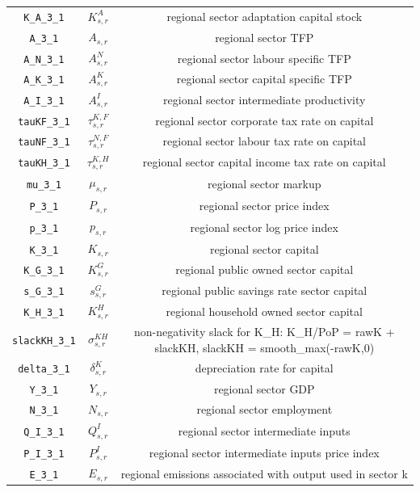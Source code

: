 \begin{center}
\begin{longtable}{ccc}
\texttt{K\_A\_3\_1} & ${K^{A}_{s,r}}$ & regional sector adaptation capital stock\\
\texttt{A\_3\_1} & ${A_{s,r}}$ & regional sector TFP\\
\texttt{A\_N\_3\_1} & ${A^{N}_{s,r}}$ & regional sector labour specific TFP\\
\texttt{A\_K\_3\_1} & ${A^{K}_{s,r}}$ & regional sector capital specific TFP\\
\texttt{A\_I\_3\_1} & ${A^{I}_{s,r}}$ & regional sector intermediate productivity\\
\texttt{tauKF\_3\_1} & ${\tau^{K,F}_{s,r}}$ & regional sector corporate tax rate on capital\\
\texttt{tauNF\_3\_1} & ${\tau^{N,F}_{s,r}}$ & regional sector labour tax rate on capital\\
\texttt{tauKH\_3\_1} & ${\tau^{K,H}_{s,r}}$ & regional sector capital income tax rate on capital\\
\texttt{mu\_3\_1} & ${\mu_{s,r}}$ & regional sector markup\\
\texttt{P\_3\_1} & ${P_{s,r}}$ & regional sector price index\\
\texttt{p\_3\_1} & ${p_{s,r}}$ & regional sector log price index\\
\texttt{K\_3\_1} & ${K_{s,r}}$ & regional sector capital\\
\texttt{K\_G\_3\_1} & ${K^G_{s,r}}$ & regional public owned sector capital\\
\texttt{s\_G\_3\_1} & ${s^G_{s,r}}$ & regional public savings rate sector capital\\
\texttt{K\_H\_3\_1} & ${K^H_{s,r}}$ & regional household owned sector capital\\
\texttt{slackKH\_3\_1} & ${\sigma^{KH}_{s,r}}$ & non-negativity slack for K\_H: K\_H/PoP = rawK + slackKH, slackKH = smooth\_max(-rawK,0)\\
\texttt{delta\_3\_1} & ${\delta^{K}_{s,r}}$ & depreciation rate for capital\\
\texttt{Y\_3\_1} & ${Y_{s,r}}$ & regional sector GDP\\
\texttt{N\_3\_1} & ${N_{s,r}}$ & regional sector employment\\
\texttt{Q\_I\_3\_1} & ${Q^{I}_{s,r}}$ & regional sector intermediate inputs\\
\texttt{P\_I\_3\_1} & ${P^{I}_{s,r}}$ & regional sector intermediate inputs price index\\
\texttt{E\_3\_1} & ${E_{s,r}}$ & regional emissions associated with output used in sector k\\

\end{longtable}
\end{center}
